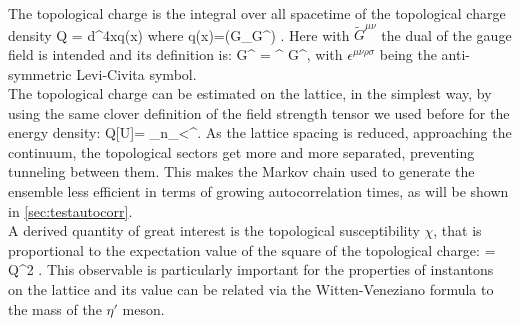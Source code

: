 The topological charge is the integral over all spacetime of the topological charge density
\beq
    Q = \int d^4xq(x)
\eeq
where
\beq 
    q(x)=\Tr(G_{\mu\nu}\tilde G^{\mu\nu}) .
\eeq 
Here with $\tilde G^{\mu\nu}$ the dual of the gauge field is intended and its definition is:
\beq
\tilde G^{\mu\nu} = \epsilon^{\mu\nu\rho\sigma} G^{\rho\sigma},
\eeq
with $\epsilon^{\mu\nu\rho\sigma}$ being the anti-symmetric Levi-Civita symbol.\\
The topological charge can be estimated on the lattice, in the simplest way, by using the same clover definition of the field strength tensor we used before for the energy density:
\beq
    Q[U]= \sum_{n\in\Lambda}\sum_{\mu<\nu}\epsilon^{\mu\nu\rho\sigma}.
\eeq
As the lattice spacing is reduced, approaching the continuum, the topological sectors get more and more separated, preventing tunneling between them. This makes the Markov chain used to generate the ensemble less efficient in terms of growing autocorrelation times, as will be shown in \cref{sec:testautocorr}.\\
A derived quantity of great interest is the topological susceptibility $\chi$, that is proportional to the expectation value of the square of the topological charge:
\beq
    \chi = \langle Q^2 \rangle.
\eeq
This observable is particularly important for the properties of instantons on the lattice and its value can be related via the Witten-Veneziano formula \cite{witten_current_1979} to the mass of the $\eta'$ meson.

